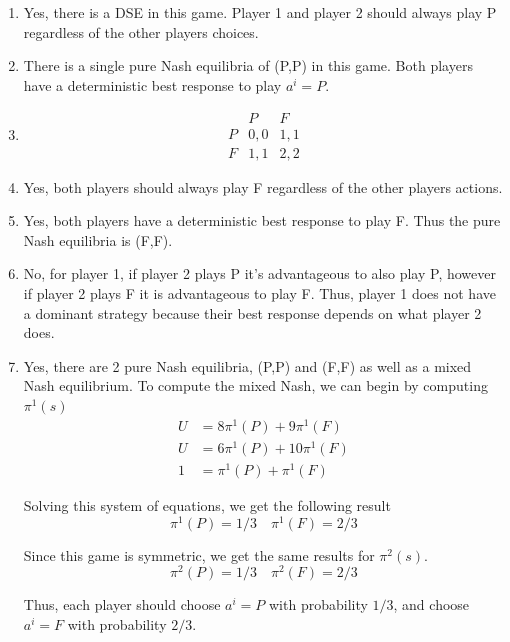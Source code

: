 \documentclass[11pt]{article}
\begin{document}
\section{}

\begin{enumerate}[label = \alph*)]
    \item 
        Yes, there is a DSE in this game. Player 1 and player 2 should always play P regardless of the other players choices.
    \item 
        There is a single pure Nash equilibria of (P,P) in this game. Both players have a deterministic best response to play $a^i = P$.

    \item 
        \[
        \begin{array}{c|cc}
        & P & F \\ \hline
        P & 0,0 & 1,1 \\
        F & 1,1 & 2,2
        \end{array}
        \]
    \item 
        Yes, both players should always play F regardless of the other players actions.
    \item 
        Yes, both players have a deterministic best response to play F. Thus the pure Nash equilibria is (F,F).
    \item 
        No, for player 1, if player 2 plays P it's advantageous to also play P, however if player 2 plays F it is advantageous to play F. Thus, player 1 does not have a dominant strategy because their best response depends on what player 2 does.
    \item
        Yes, there are 2 pure Nash equilibria, (P,P) and (F,F) as well as a mixed Nash equilibrium. 
        To compute the mixed Nash, we can begin by computing $\pi^1(s)$
        \begin{align*}
            U &= 8 \pi^1(P) + 9 \pi^1(F)  \\
            U &= 6 \pi^1(P) + 10 \pi^1(F) \\
            1 &= \pi^1(P) + \pi^1(F)
        \end{align*}

        Solving this system of equations, we get the following result
        \[ \pi^1(P) = 1/3 \quad \pi^1(F) = 2/3\]

        Since this game is symmetric, we get the same results for $\pi^2(s)$.
        \[ \pi^2(P) = 1/3 \quad \pi^2(F) = 2/3\]

        Thus, each player should choose $a^i = P$ with probability $1/3$, and choose $a^i = F$ with probability $2/3$.
\end{enumerate}
\end{document}
